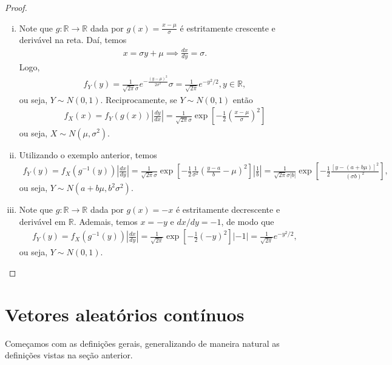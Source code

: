 \documentclass[../Notas.tex]{subfiles}
\begin{document}
\begin{proof}
\begin{enumerate}[(i)]
    \item Note que $g:\mathbb{R}\to\mathbb{R}$ dada por $g(x) = \displaystyle{ \frac{x-\mu}{\sigma} }$ é estritamente crescente e derivável na reta. Daí, temos
    \begin{align*}
        x = \sigma y + \mu \implies \frac{dx}{dy} = \sigma.
    \end{align*}
    Logo, 
    \begin{align*}
        f_Y(y) = \frac{1}{\sqrt{2\pi}\sigma}e^{ -\frac{(y-\mu)^2}{2\sigma^2} }\sigma = \frac{1}{\sqrt{2\pi}}e^{-y^2/2}, y\in\mathbb{R},
    \end{align*}
    ou seja, $Y\sim N(0,1)$. Reciprocamente, se $Y\sim N(0,1)$ então
    \begin{align*}
        f_X(x) = f_Y(g(x))\left|\frac{dy}{dx}\right| = \frac{1}{\sqrt{2\pi}\sigma}\exp[-\frac{1}{2}(\frac{x-\mu}{\sigma})^2]
    \end{align*}
    ou seja, $X\sim N(\mu, \sigma^2)$.
    \item Utilizando o exemplo anterior, temos
    \begin{align*}
        f_Y(y) = f_X(g^{-1}(y))\left|\frac{dx}{dy}\right| = \frac{1}{\sqrt{2\pi}\sigma}\exp[-\frac{1}{2}\frac{1}{\sigma^2}(\frac{y-a}{b} - \mu)^2]\left|\frac{1}{b}\right| = \frac{1}{\sqrt{2\pi}\sigma|b|} \exp[ -\frac{1}{2}\frac{ [ y - (a+b\mu) ]^2 }{ (\sigma b)^2 } ],
    \end{align*}
    ou seja, $Y\sim N(a + b\mu, b^2\sigma^2)$.
    \item Note que $g:\mathbb{R}\to\mathbb{R}$ dada por $g(x) = -x$ é estritamente decrescente e derivável em $\mathbb{R}$. Ademais, temos $x = -y$ e $dx/dy = -1$, de modo que
    \begin{align*}
        f_Y(y) = f_X(g^{-1}(y)) \left|\frac{dx}{dy}\right| = \frac{1}{\sqrt{2\pi}}\exp[ -\frac{1}{2}(-y)^2 ]|-1| = \frac{1}{\sqrt{2\pi}} e^{-y^2/2},
    \end{align*}
    ou seja, $Y\sim N(0,1)$.
\end{enumerate}
\end{proof}

\section{Vetores aleatórios contínuos}
Começamos com as definições gerais, generalizando de maneira natural as definições vistas na seção anterior.
\end{document}
